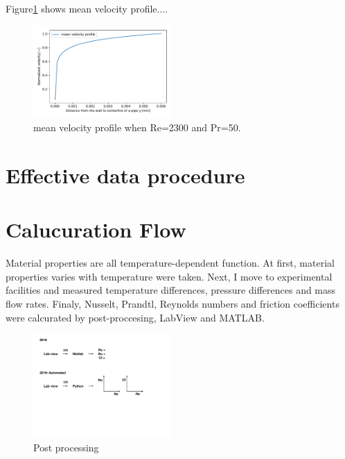 \documentclass[conference]{IEEEtran}
\begin{document}
Figure\ref{mean_velocity_profile} shows mean velocity profile....
\begin{figure}[htbp]
  \centering
  \vspace{5zh}
  \includegraphics[width=0.47\textwidth,natwidth=400,natheight=200]{fig/velocity_profile.pdf}
  \vspace{-1.5zh}
  \caption{mean velocity profile when Re=2300 and Pr=50.}
  \label{mean_velocity_profile}
\end{figure}

\section{Effective data procedure}


\section{Calucuration Flow}
Material properties are all temperature-dependent function.
At first, material properties varies with temperature were taken.
Next, I move to experimental facilities and measured temperature differences, pressure differences and mass flow rates.
Finaly, Nusselt, Prandtl, Reynolds numbers and friction coefficients were calcurated by post-proccesing, LabView and MATLAB.
\begin{figure}[htbp]
  \centering
  \vspace{5zh}
  \includegraphics[width=0.47\textwidth,natwidth=400,natheight=200]{fig/post_processing.pdf}
  \caption{Post processing}
  \label{post_processing}
\end{figure}
\end{document}
